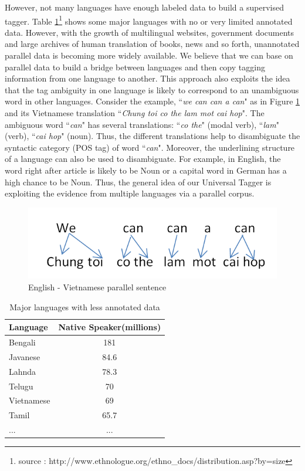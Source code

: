 However, not many languages have enough labeled data to build a supervised tagger. Table \ref{tab:majorLanguageLessData}\footnote{source : http://www.ethnologue.org/ethno\_docs/distribution.asp?by=size} shows some major languages with no or very limited annotated data. However, with the growth of multilingual websites, government documents and large archives of human translation of books, news and so forth, unannotated parallel data is becoming more widely available. We believe that we can base on parallel data to build a bridge between languages and then copy tagging information from one language to another. This approach also exploits the idea that the tag ambiguity in one language is likely to correspond to an unambiguous word in other languages. Consider the example, ``\textit{we can can a can}" as in Figure \ref{fig:EnViparallel} and its Vietnamese translation ``\textit{Chung toi co the lam mot cai hop}". The ambiguous word ``\textit{can}" has several translations: ``\textit{co the}" (modal verb), ``\textit{lam}" (verb), ``\textit{cai hop}" (noun). Thus, the different translations help to disambiguate the syntactic category (POS tag) of word ``\textit{can}". Moreover, the underlining structure of a language can also be used to disambiguate. For example, in English, the word right after article is likely to be Noun or a capital word in German has a high chance to be Noun. Thus, the general idea of our Universal Tagger is exploiting the evidence from multiple languages via a parallel corpus. 
\begin{figure}
\centering
\includegraphics[scale=0.6]{Figures/EN_VI_SAMPLE}
\caption{English - Vietnamese parallel sentence}
\label{fig:EnViparallel}
\end{figure}

\begin{table}
  \centering
    \begin{tabular}{l|c}
    \textbf{Language} & \textbf{Native Speaker(millions)} \\
	\hline
	Bengali & 181 \\
    Javanese & 84.6 \\
    Lahnda & 78.3 \\
    Telugu & 70 \\
    Vietnamese & 69 \\
    Tamil & 65.7 \\
    ... & ...\\
    \end{tabular}%
	 \caption{Major languages with less annotated data 
	 }
  \label{tab:majorLanguageLessData}%
\end{table}%


